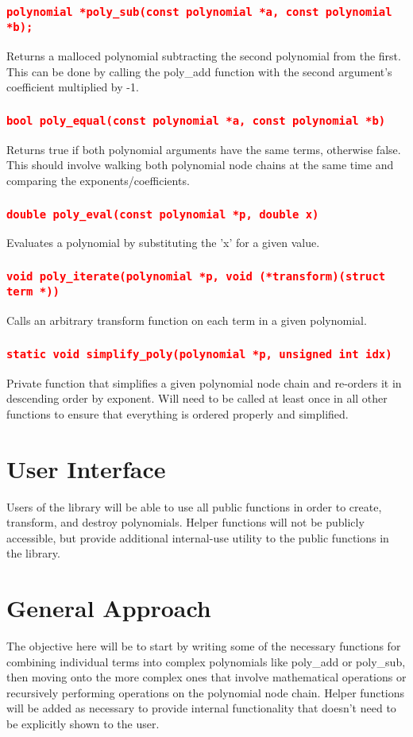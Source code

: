 \documentclass[11pt]{report}
\begin{document}
\subsubsection*{\texttt{\textcolor{red}{polynomial *poly\_sub(const polynomial *a, const polynomial *b);}}}
Returns a malloced polynomial subtracting the second polynomial from the first. This can be done by calling the poly\_add function with the second argument's coefficient multiplied by -1.
\subsubsection*{\texttt{\textcolor{red}{bool poly\_equal(const polynomial *a, const polynomial *b)}}}
Returns true if both polynomial arguments have the same terms, otherwise false. This should involve walking both polynomial node chains at the same time and comparing the exponents/coefficients.
\subsubsection*{\texttt{\textcolor{red}{double poly\_eval(const polynomial *p, double x)}}}
Evaluates a polynomial by substituting the 'x' for a given value.
\subsubsection*{\texttt{\textcolor{red}{void poly\_iterate(polynomial *p, void (*transform)(struct term *))}}}
Calls an arbitrary transform function on each term in a given polynomial.
\subsubsection*{\texttt{\textcolor{red}{static void simplify\_poly(polynomial *p, unsigned int idx)}}}
Private function that simplifies a given polynomial node chain and re-orders it in descending order by exponent. Will need to be called at least once in all other functions to ensure that everything is ordered properly and simplified.
\pagebreak
\section*{User Interface}
Users of the library will be able to use all public functions in order to create, transform, and destroy polynomials. Helper functions will not be publicly accessible, but provide additional internal-use utility to the public functions in the library.
\pagebreak
\section*{General Approach}
The objective here will be to start by writing some of the necessary functions for combining individual terms into complex polynomials like poly\_add or poly\_sub, then moving onto the more complex ones that involve mathematical operations or recursively performing operations on the polynomial node chain. Helper functions will be added as necessary to provide internal functionality that doesn't need to be explicitly shown to the user.
\end{document}
